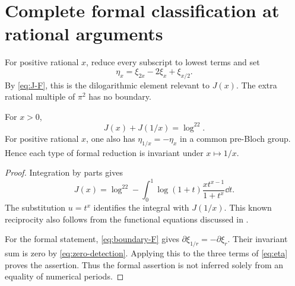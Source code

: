 \section{Complete formal classification at rational arguments}
\label{sec:classification}

For positive rational $x$, reduce every subscript to lowest terms and set
\begin{equation}\label{eq:eta}
 \eta_x=\xi_{2x}-2\xi_x+\xi_{x/2}.
\end{equation}
By \eqref{eq:J-F}, this is the dilogarithmic element relevant to $J(x)$.
The extra rational multiple of $\pi^2$ has no boundary.

\begin{lemma}\label{lem:reciprocity}
For $x>0$,
\begin{equation}\label{eq:J-reciprocity}
 J(x)+J(1/x)=\log^22.
\end{equation}
For positive rational $x$, one also has $\eta_{1/x}=-\eta_x$ in a
common pre-Bloch group. Hence each type of formal reduction is invariant
under $x\mapsto1/x$.
\end{lemma}
\begin{proof}
Integration by parts gives
\[
 J(x)=\log^22-\int_0^1
       \log(1+t)\frac{x t^{x-1}}{1+t^x}\dd t.
\]
The substitution $u=t^x$ identifies the integral with $J(1/x)$. This
known reciprocity also follows from the functional equations discussed
in \cite{CK}.

For the formal statement, \eqref{eq:boundary-F} gives
$\partial\xi_{1/r}=-\partial\xi_r$. Their invariant sum is zero by
\eqref{eq:zero-detection}. Applying this to the three terms of
\eqref{eq:eta} proves the assertion. Thus the formal assertion is not
inferred solely from an equality of numerical periods.
\end{proof}


